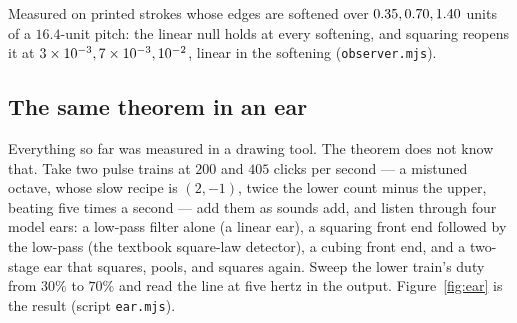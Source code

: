 Measured on printed strokes whose edges are softened over $0.35, 0.70, 1.40$
units of a $16.4$-unit pitch: the linear null holds at every softening,
and squaring reopens it at $3\times 10^{-3}, 7\times 10^{-3}, 10^{-2}$, linear in the softening
(\texttt{observer.mjs}).

\subsection{The same theorem in an ear}
\label{sec:ear}

Everything so far was measured in a drawing tool. The theorem does not know
that. Take two pulse trains at $200$ and $405$ clicks per second --- a
mistuned octave, whose slow recipe is $(2,-1)$, twice the lower count minus
the upper, beating five times a second --- add them as sounds add, and
listen through four model ears: a low-pass filter alone (a linear ear),
a squaring front end followed by the low-pass (the textbook square-law
detector), a cubing front end, and a two-stage ear that squares, pools, and
squares again. Sweep the lower train's duty from $30\%$ to $70\%$ and
read the line at five hertz in the output. Figure~\ref{fig:ear} is the
result (script \texttt{ear.mjs}).

